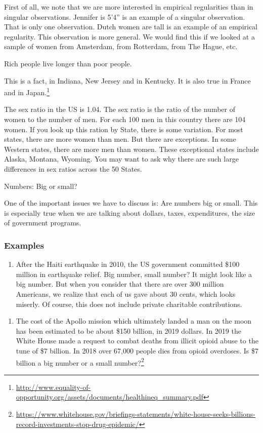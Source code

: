 \documentclass[
]{book}
\providecommand{\tightlist}{%
  \setlength{\itemsep}{0pt}\setlength{\parskip}{0pt}}
\begin{document}
First of all, we note that we are more interested in empirical regularities than in singular observations. Jennifer is 5'4'' is an example of a singular observation. That is only one observation. Dutch women are tall is an example of an empirical regularity. This observation is more general. We would find this if we looked at a sample of women from Amsterdam, from Rotterdam, from The Hague, etc.

Rich people live longer than poor people.

This is a fact, in Indiana, New Jersey and in Kentucky. It is also true in France and in Japan.\footnote{\url{http://www.equality-of-opportunity.org/assets/documents/healthineq_summary.pdf}}

The sex ratio in the US is 1.04. The sex ratio is the ratio of the number of women to the number of men. For each 100 men in this country there are 104 women. If you look up this ration by State, there is some variation. For most states, there are more women than men. But there are exceptions. In some Western states, there are more men than women. These exceptional states include Alaska, Montana, Wyoming. You may want to ask why there are such large differences in sex ratios across the 50 States.

Numbers: Big or small?

One of the important issues we have to discuss is: Are numbers big or small. This is especially true when we are talking about dollars, taxes, expenditures, the size of government programs.

\hypertarget{examples-1}{%
\subsubsection{Examples}\label{examples-1}}

\begin{enumerate}
\def\labelenumi{\arabic{enumi}.}
\tightlist
\item
  After the Haiti earthquake in 2010, the US government committed \$100 million in earthquake relief. Big number, small number? It might look like a big number. But when you consider that there are over 300 million Americans, we realize that each of us gave about 30 cents, which looks miserly. Of course, this does not include private charitable contributions.
\end{enumerate}

\begin{enumerate}
\def\labelenumi{\arabic{enumi}.}
\setcounter{enumi}{1}
\tightlist
\item
  The cost of the Apollo mission which ultimately landed a man on the moon has been estimated to be about \$150 billion, in 2019 dollars. In 2019 the White House made a request to combat deaths from illicit opioid abuse to the tune of \$7 billion. In 2018 over 67,000 people dies from opioid overdoses. Is \$7 billion a big number or a small number?\footnote{\url{https://www.whitehouse.gov/briefings-statements/white-house-seeks-billions-record-investments-stop-drug-epidemic/}}
\end{enumerate}
\end{document}
